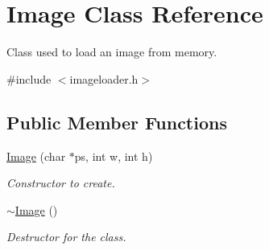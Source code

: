 \hypertarget{class_image}{\section{Image Class Reference}
\label{class_image}
}


Class used to load an image from memory.  




{\ttfamily \#include $<$imageloader.\-h$>$}

\subsection*{Public Member Functions}
\begin{DoxyCompactItemize}
\item 
\hypertarget{class_image_a68e85406b33c38cc93a22b0121da47d9}{\hyperlink{class_image_a68e85406b33c38cc93a22b0121da47d9}{Image} (char $\ast$ps, int w, int h)}\label{class_image_a68e85406b33c38cc93a22b0121da47d9}

\begin{DoxyCompactList}\small\item\em Constructor to create. \end{DoxyCompactList}\item 
\hypertarget{class_image_a0294f63700543e11c0f0da85601c7ae5}{\hyperlink{class_image_a0294f63700543e11c0f0da85601c7ae5}{$\sim$\-Image} ()}\label{class_image_a0294f63700543e11c0f0da85601c7ae5}

\begin{DoxyCompactList}\small\item\em Destructor for the class. \end{DoxyCompactList}\end{DoxyCompactItemize}
